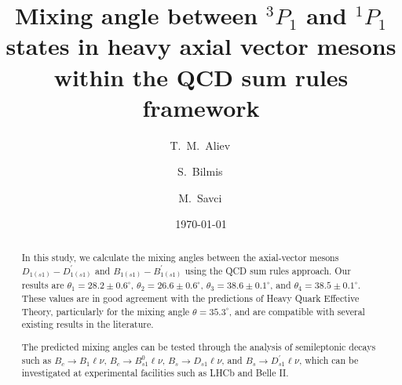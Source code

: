 \documentclass[prd,a4paper,preprint,preprintnumbers,nofootinbib,superscriptaddress]{revtex4-2}
\begin{document}


\title{Mixing angle between $^{3}P_1$ and $^{1}P_1$ states in heavy axial vector mesons within the QCD sum rules framework}

\author{T.~M.~Aliev\,}

\author{S.~Bilmis\,}

\author{M.~Savci\,}

\date{\today}


\begin{abstract}

In this study, we calculate the mixing angles between the axial-vector mesons $D_{1(s1)} - D_{1(s1)}^\prime$ and $B_{1(s1)} - B_{1(s1)}^\prime$ using the QCD sum rules approach. Our results are $\theta_1 = 28.2 \pm 0.6^\circ$, $\theta_2 = 26.6 \pm 0.6^\circ$, $\theta_3 = 38.6 \pm 0.1^\circ$, and $\theta_4 = 38.5 \pm 0.1^\circ$. These values are in good agreement with the predictions of Heavy Quark Effective Theory, particularly for the mixing angle $\theta = 35.3^\circ$, and are compatible with several existing results in the literature. 

The predicted mixing angles can be tested through the analysis of semileptonic decays such as $B_c \to B_1 \ell \nu$, $B_c \to B_{s1}^0 \ell \nu$, $B_s \to D_{s1} \ell \nu$, and $B_s \to D_{s1}^\prime \ell \nu$, which can be investigated at experimental facilities such as LHCb and Belle II.


\end{abstract}

\maketitle



\newpage

\end{document}
